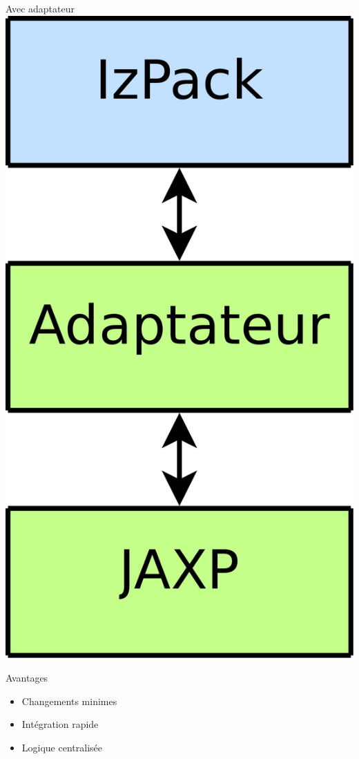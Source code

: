 \begin{frame}
\begin{minipage}[c]{.3\linewidth}
\begin{beamerboxesrounded}[shadow=true]{Avec adaptateur}
		\includegraphics[width=.8\linewidth]{../image/avecAdaptateur.png}
	\end{beamerboxesrounded}
\end{minipage}
\hfil
\vfill
\begin{minipage}[c]{\linewidth}
	\begin{beamerboxesrounded}[shadow=true]{Avantages}
	\begin{itemize}
		\item Changements minimes
		\item Intégration rapide
		\item Logique centralisée
	\end{itemize}
	\end{beamerboxesrounded}
\end{minipage}
\vfill
\end{frame}
